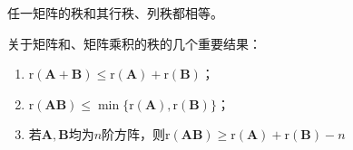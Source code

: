 \begin{theorem}
    任一矩阵的秩和其行秩、列秩都相等。
\end{theorem}

\begin{theorem}
    关于矩阵和、矩阵乘积的秩的几个重要结果：
    \begin{enumerate}[(1)]
        \item $\mathrm{r}(\boldsymbol{A}+\boldsymbol{B})\leq \mathrm{r}(\boldsymbol{A})+\mathrm{r}(\boldsymbol{B})$；
        \item $\mathrm{r}(\boldsymbol{A}\boldsymbol{B})\leq \min\{\mathrm{r}(\boldsymbol{A}),\mathrm{r}(\boldsymbol{B})\}$；
        \item 若$\boldsymbol{A},\boldsymbol{B}$均为$n$阶方阵，则$\mathrm{r}(\boldsymbol{A}\boldsymbol{B})\geq \mathrm{r}(\boldsymbol{A})+\mathrm{r}(\boldsymbol{B})-n$
    \end{enumerate}
\end{theorem}